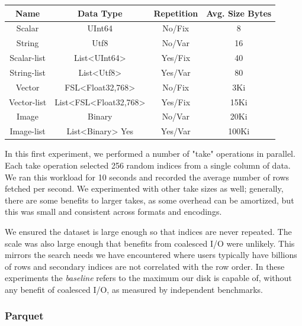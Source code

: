\documentclass[sigconf, nonacm]{acmart}
\begin{document}
\begin{center}
\begin{tabular}{|c c c c|}
\hline
Name & Data Type & Repetition & Avg. Size Bytes \\
\hline
\hline
Scalar & UInt64 & No/Fix & 8 \\
\hline
String & Utf8 & No/Var & 16 \\
\hline
Scalar-list & List<UInt64> & Yes/Fix & 40 \\
\hline
String-list & List<Utf8> & Yes/Var & 80 \\
\hline
Vector & FSL<Float32,768> & No/Fix & 3Ki \\
\hline
Vector-list & List<FSL<Float32,768> & Yes/Fix & 15Ki \\
\hline
Image & Binary & No/Var & 20Ki \\
\hline
Image-list & List<Binary> Yes & Yes/Var & 100Ki \\
\hline
\end{tabular}
\end{center}

In this first experiment, we performed a number of "take" operations in parallel.  Each take operation selected 256 random indices from a single column of data.  We ran this workload for 10 seconds and recorded the average number of rows fetched per second.  We experimented with other take sizes as well; generally, there are some benefits to larger takes, as some overhead can be amortized, but this was small and consistent across formats and encodings.

We ensured the dataset is large enough so that indices are never repeated.  The scale was also large enough that benefits from coalesced I/O were unlikely.  This mirrors the search needs we have encountered where users typically have billions of rows and secondary indices are not correlated with the row order.  In these experiments the \textit{baseline} refers to the maximum our disk is capable of, without any benefit of coalesced I/O, as measured by independent benchmarks.

\subsubsection{Parquet}
\end{document}
